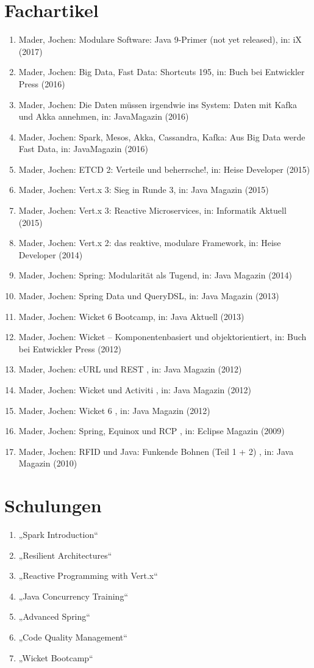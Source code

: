 \section*{Fachartikel}
\begin{enumerate}[label=,leftmargin=0cm,itemsep=10pt]
\item Mader, Jochen: Modulare Software: Java 9-Primer (not yet released), in: iX (2017)
\item Mader, Jochen: Big Data, Fast Data: Shortcuts 195, in: Buch bei Entwickler Press (2016)
\item Mader, Jochen: Die Daten müssen irgendwie ins System: Daten mit Kafka und Akka annehmen, in: JavaMagazin (2016) 
\item Mader, Jochen: Spark, Mesos, Akka, Cassandra, Kafka: Aus Big Data werde Fast Data, in: JavaMagazin (2016)
\item Mader, Jochen: ETCD 2: Verteile und beherrsche!, in: Heise Developer (2015)
\item Mader, Jochen: Vert.x 3: Sieg in Runde 3, in: Java Magazin (2015)
\item Mader, Jochen: Vert.x 3: Reactive Microservices, in: Informatik Aktuell (2015)
\item Mader, Jochen: Vert.x 2: das reaktive, modulare Framework, in: Heise Developer (2014)
\item Mader, Jochen: Spring: Modularität als Tugend, in: Java Magazin (2014)
\item Mader, Jochen: Spring Data und QueryDSL, in: Java Magazin (2013)
\item Mader, Jochen: Wicket 6 Bootcamp, in: Java Aktuell (2013)
\item Mader, Jochen: Wicket – Komponentenbasiert und objektorientiert, in: Buch bei Entwickler Press (2012)
\item Mader, Jochen: cURL und REST , in: Java Magazin (2012)
\item Mader, Jochen: Wicket und Activiti , in: Java Magazin (2012)
\item Mader, Jochen: Wicket 6 , in: Java Magazin (2012)
\item Mader, Jochen: Spring, Equinox und RCP , in: Eclipse Magazin (2009)
\item Mader, Jochen: RFID und Java: Funkende Bohnen (Teil 1 + 2) , in: Java Magazin (2010)
\end{enumerate}

\section*{Schulungen}
\begin{enumerate}[label=,leftmargin=0cm,itemsep=10pt]
\item „Spark Introduction“
\item „Resilient Architectures“
\item „Reactive Programming with Vert.x“
\item „Java Concurrency Training“
\item „Advanced Spring“
\item „Code Quality Management“
\item „Wicket Bootcamp“
\end{enumerate}
